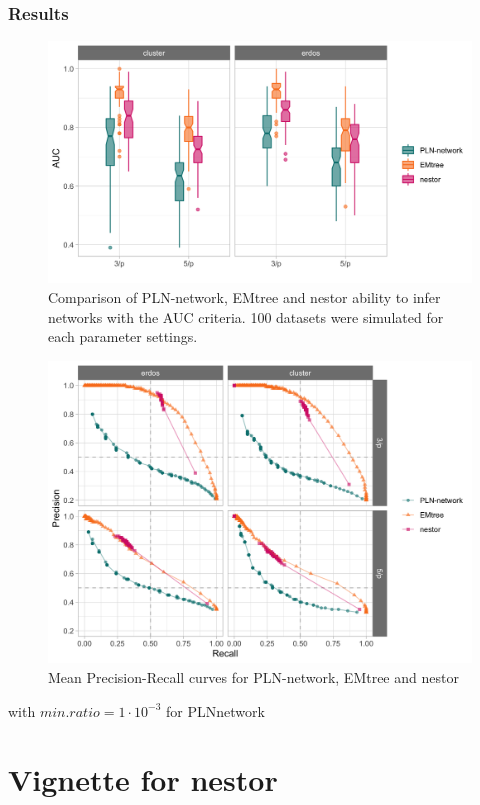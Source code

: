 \begin{subappendices}
\subsubsection*{Results}
\begin{figure}
\centering
\includegraphics[width=12cm]{figs/AUC_PLN_EM_VEM.png}
\caption{Comparison of PLN-network, EMtree and nestor ability to infer networks with the AUC criteria. 100 datasets were simulated for each parameter settings.}
\label{compar:auc}
\end{figure}
\begin{figure}
\centering
\includegraphics[width=12cm]{figs/precrec_PLN_EM_VEM.png}
\caption{Mean Precision-Recall curves for PLN-network, EMtree and nestor }
\label{compar:precrec}
\end{figure}

with $min.ratio=1\cdot 10^{-3}$ for PLNnetwork
\section{Vignette for nestor}
\end{subappendices}
